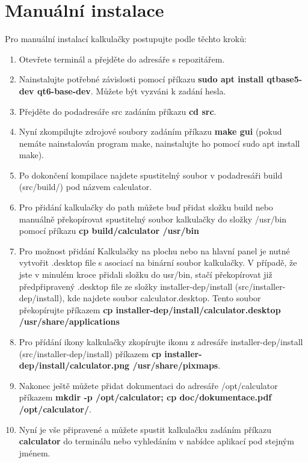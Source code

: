 \documentclass[a4paper, 11pt]{article}
\begin{document}
    \section{Manuální instalace}
    Pro manuální instalací kalkulačky postupujte podle těchto kroků:
    \begin{enumerate}
        \item Otevřete terminál a přejděte do adresáře s repozitářem. 
        \item Nainstalujte potřebné závislosti pomocí příkazu \textbf{sudo apt install  qtbase5-dev
        qt6-base-dev}. Můžete být vyzváni k zadání hesla.
        \item Přejděte do podadresáře src zadáním příkazu \textbf{cd src}.
        \item Nyní zkompilujte zdrojové soubory zadáním příkazu \textbf{make gui} (pokud nemáte nainstalován program make, nainstalujte ho pomocí sudo apt install make).
        \item Po dokončení kompilace najdete spustitelný soubor v podadresáři build (src/build/) pod názvem calculator. 
        \item Pro přidání kalkulačky do path můžete buď přidat složku build nebo manuálně překopírovat spustitelný soubor kalkulačky do složky /usr/bin pomocí příkazu \textbf{cp build/calculator /usr/bin}
        \item Pro možnost přidání Kalkulačky na plochu nebo na hlavní panel je nutné vytvořit .desktop file s asociací na binární soubor kalkulačky. V případě, že jste v minulém kroce přidali složku do usr/bin, stačí překopírovat již předpřipravený .desktop file ze složky installer-dep/install (src/installer-dep/install), kde najdete soubor calculator.desktop. Tento soubor překopírujte příkazem \textbf{cp installer-dep/install/calculator.desktop /usr/share/applications}
        \item Pro přídání ikony kalkulačky zkopírujte ikonu z adresáře installer-dep/install (src/installer-dep/install) příkazem \textbf{cp installer-dep/install/calculator.png /usr/share/pixmaps}.
        \item Nakonec ještě můžete přidat dokumentaci do adresáře /opt/calculator příkazem \textbf{mkdir -p /opt/calculator; cp doc/dokumentace.pdf /opt/calculator/}.
        \item Nyní je vše připravené a můžete spustit kalkulačku zadáním příkazu \textbf{calculator} do terminálu nebo vyhledáním v nabídce aplikací pod stejným jménem.
    \end{enumerate}
\end{document}
